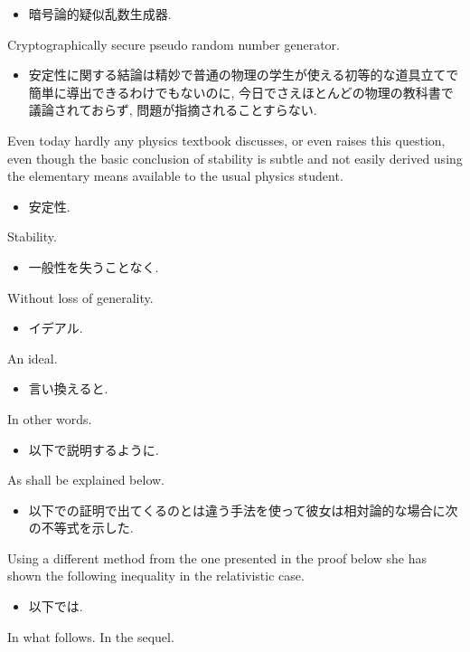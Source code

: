 \documentclass[openany, a4paper, oneside]{jsbook}
\begin{document}
\begin{itemize}
\item 暗号論的疑似乱数生成器.
\end{itemize}
Cryptographically secure pseudo random number generator.

\begin{itemize}
\item 安定性に関する結論は精妙で普通の物理の学生が使える初等的な道具立てで簡単に導出できるわけでもないのに,
今日でさえほとんどの物理の教科書で議論されておらず, 問題が指摘されることすらない. \cite{LiebSeiringer1}
\end{itemize}
Even today hardly any physics textbook discusses, or even raises this question,
even though the basic conclusion of stability is subtle and not easily derived
using the elementary means available to the usual physics student.

\begin{itemize}
\item 安定性.
\end{itemize}
Stability.

\begin{itemize}
\item 一般性を失うことなく.
\end{itemize}
Without loss of generality.

\begin{itemize}
\item イデアル.
\end{itemize}
An ideal.

\begin{itemize}
\item 言い換えると.
\end{itemize}
In other words.

\begin{itemize}
\item 以下で説明するように. \cite{LiebSeiringer1}
\end{itemize}
As shall be explained below.

\begin{itemize}
\item 以下での証明で出てくるのとは違う手法を使って彼女は相対論的な場合に次の不等式を示した. \cite{LiebSeiringer1}
\end{itemize}
Using a different method from the one presented in the proof below
she has shown the following inequality in the relativistic case.

\begin{itemize}
\item 以下では. \cite{LiebSeiringer1, CharlesWeibel1}
\end{itemize}
In what follows. In the sequel.
\end{document}
